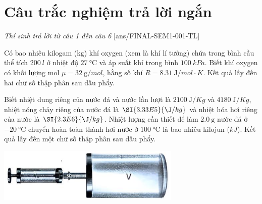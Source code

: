 \section{Câu trắc nghiệm trả lời ngắn} \textit{Thí sinh trả lời từ câu 1 đến câu 6}
\setcounter{ex}{0}
[ans/FINAL-SEM1-001-TL]
\begin{ex}
	Có bao nhiêu kilogam ($\si{\kg}$) khí oxygen (xem là khí lí tưởng) chứa trong bình cầu thể tích $\SI{200}{l}$ ở nhiệt độ $\SI{27}{\celsius}$ và áp suất khí trong bình $\SI{100}{kPa}$. Biết khí oxygen có khối lượng mol $\mu=\SI{32}{\g/mol}$, hằng số khí $R=\SI{8.31}{\J/mol\cdot K}$. Kết quả lấy đến hai chữ số thập phân sau dấu phẩy.
\end{ex}
\begin{ex}
	Biết nhiệt dung riêng của nước đá và nước lần lượt là $\SI{2100}{\J/Kg}$ và $\SI{4180}{\J/Kg}$, nhiệt nóng chảy riêng của nước đá là $\SI{3.33E5}{\J/kg}$ và nhiệt hóa hơi riêng của nước là $\SI{2.3E6}{\J/kg}$. Nhiệt lượng cần thiết để làm $\SI{2.0}{\g}$ nước đá ở $\SI{-20}{\celsius}$ chuyển hoàn toàn thành hơi nước ở $\SI{100}{\celsius}$ là bao nhiêu kilojun ($\si{kJ}$). Kết quả lấy đến một chữ số thập phân sau dấu phẩy.
\end{ex}
\begin{ex}
	{\includegraphics[scale=0.7]{../figs/FINAL_SEM1_001_5}}
\end{ex}
